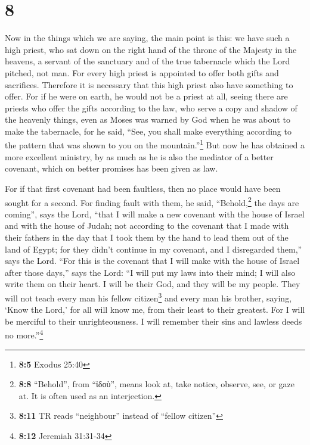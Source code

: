 \hypertarget{section-7}{%
\section{8}\label{section-7}}

 Now in the things which we are saying, the main point is
this: we have such a high priest, who sat down on the right hand of the
throne of the Majesty in the heavens,  a servant of the
sanctuary and of the true tabernacle which the Lord pitched, not man.
 For every high priest is appointed to offer both gifts
and sacrifices. Therefore it is necessary that this high priest also
have something to offer.  For if he were on earth, he
would not be a priest at all, seeing there are priests who offer the
gifts according to the law,  who serve a copy and shadow
of the heavenly things, even as Moses was warned by God when he was
about to make the tabernacle, for he said, ``See, you shall make
everything according to the pattern that was shown to you on the
mountain.''\footnote{\textbf{8:5} Exodus 25:40}  But now
he has obtained a more excellent ministry, by as much as he is also the
mediator of a better covenant, which on better promises has been given
as law.

 For if that first covenant had been faultless, then no
place would have been sought for a second.  For finding
fault with them, he said, ``Behold,\footnote{\textbf{8:8} ``Behold'',
  from ``ἰδοὺ'', means look at, take notice, observe, see, or gaze at.
  It is often used as an interjection.} the days are coming'', says the
Lord, ``that I will make a new covenant with the house of Israel and
with the house of Judah;  not according to the covenant
that I made with their fathers in the day that I took them by the hand
to lead them out of the land of Egypt; for they didn't continue in my
covenant, and I disregarded them,'' says the Lord.  ``For
this is the covenant that I will make with the house of Israel after
those days,'' says the Lord: ``I will put my laws into their mind; I
will also write them on their heart. I will be their God, and they will
be my people.  They will not teach every man his fellow
citizen\footnote{\textbf{8:11} TR reads ``neighbour'' instead of
  ``fellow citizen''} and every man his brother, saying, `Know the
Lord,' for all will know me, from their least to their greatest.
 For I will be merciful to their unrighteousness. I will
remember their sins and lawless deeds no more.''\footnote{\textbf{8:12}
  Jeremiah 31:31-34}


